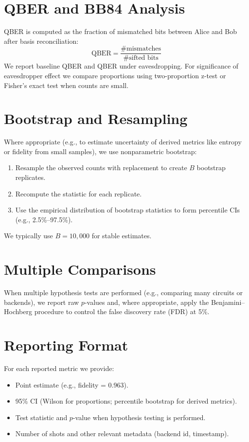 \documentclass[11pt]{article}
\begin{document}
\section{QBER and BB84 Analysis}
QBER is computed as the fraction of mismatched bits between Alice and Bob after basis reconciliation:
\[
\text{QBER} = \frac{\text{\# mismatches}}{\text{\# sifted bits}}
\]
We report baseline QBER and QBER under eavesdropping. For significance of eavesdropper effect we compare proportions using two-proportion z-test or Fisher's exact test when counts are small.

\section{Bootstrap and Resampling}
Where appropriate (e.g., to estimate uncertainty of derived metrics like entropy or fidelity from small samples), we use nonparametric bootstrap:
\begin{enumerate}
  \item Resample the observed counts with replacement to create $B$ bootstrap replicates.
  \item Recompute the statistic for each replicate.
  \item Use the empirical distribution of bootstrap statistics to form percentile CIs (e.g., 2.5\%--97.5\%).
\end{enumerate}
We typically use $B=10{,}000$ for stable estimates.

\section{Multiple Comparisons}
When multiple hypothesis tests are performed (e.g., comparing many circuits or backends), we report raw $p$-values and, where appropriate, apply the Benjamini–Hochberg procedure to control the false discovery rate (FDR) at 5\%.

\section{Reporting Format}
For each reported metric we provide:
\begin{itemize}
  \item Point estimate (e.g., fidelity = 0.963).
  \item 95\% CI (Wilson for proportions; percentile bootstrap for derived metrics).
  \item Test statistic and $p$-value when hypothesis testing is performed.
  \item Number of shots and other relevant metadata (backend id, timestamp).
\end{itemize}
\end{document}
